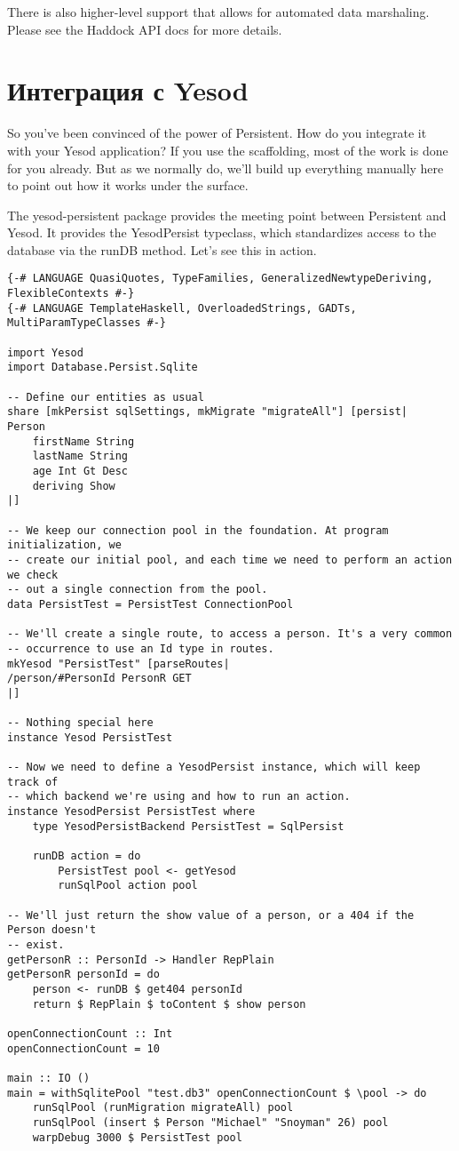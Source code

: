 There is also higher-level support that allows for automated data marshaling. Please see the Haddock API docs for more details.

\section{Интеграция с Yesod} %

So you've been convinced of the power of Persistent. How do you integrate it with your Yesod application? If you use the scaffolding, most of the work is done for you already. But as we normally do, we'll build up everything manually here to point out how it works under the surface.

The yesod-persistent package provides the meeting point between Persistent and Yesod. It provides the YesodPersist typeclass, which standardizes access to the database via the runDB method. Let's see this in action.

\begin{lstlisting}
{-# LANGUAGE QuasiQuotes, TypeFamilies, GeneralizedNewtypeDeriving, FlexibleContexts #-}
{-# LANGUAGE TemplateHaskell, OverloadedStrings, GADTs, MultiParamTypeClasses #-}

import Yesod
import Database.Persist.Sqlite

-- Define our entities as usual
share [mkPersist sqlSettings, mkMigrate "migrateAll"] [persist|
Person
    firstName String
    lastName String
    age Int Gt Desc
    deriving Show
|]

-- We keep our connection pool in the foundation. At program initialization, we
-- create our initial pool, and each time we need to perform an action we check
-- out a single connection from the pool.
data PersistTest = PersistTest ConnectionPool

-- We'll create a single route, to access a person. It's a very common
-- occurrence to use an Id type in routes.
mkYesod "PersistTest" [parseRoutes|
/person/#PersonId PersonR GET
|]

-- Nothing special here
instance Yesod PersistTest

-- Now we need to define a YesodPersist instance, which will keep track of
-- which backend we're using and how to run an action.
instance YesodPersist PersistTest where
    type YesodPersistBackend PersistTest = SqlPersist

    runDB action = do
        PersistTest pool <- getYesod
        runSqlPool action pool

-- We'll just return the show value of a person, or a 404 if the Person doesn't
-- exist.
getPersonR :: PersonId -> Handler RepPlain
getPersonR personId = do
    person <- runDB $ get404 personId
    return $ RepPlain $ toContent $ show person

openConnectionCount :: Int
openConnectionCount = 10

main :: IO ()
main = withSqlitePool "test.db3" openConnectionCount $ \pool -> do
    runSqlPool (runMigration migrateAll) pool
    runSqlPool (insert $ Person "Michael" "Snoyman" 26) pool
    warpDebug 3000 $ PersistTest pool
\end{lstlisting}%

